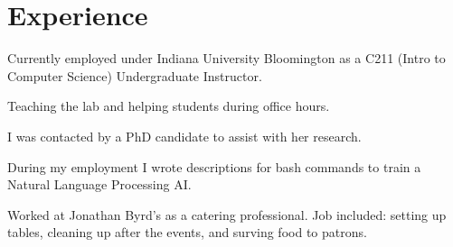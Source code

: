 \documentclass[]{deedy-resume-openfont}
\begin{document}
%
%
\lastupdated

%
%



\section{Experience}

\vspace{\topsep} %
\begin{tightemize}
\item Currently employed under Indiana University Bloomington as a C211 (Intro to Computer Science) Undergraduate Instructor.
\item Teaching the lab and helping students during office hours.
\end{tightemize}
\sectionsep

\vspace{\topsep} %
\begin{tightemize}
\item I was contacted by a PhD candidate to assist with her research.
\item During my employment I wrote descriptions for bash commands to train a Natural Language Processing AI.
\end{tightemize}
\sectionsep

\begin{tightemize}
\item Worked at Jonathan Byrd’s as a catering professional. Job included: setting up tables,
cleaning up after the events, and surving food to patrons.
\end{tightemize}
\sectionsep
\end{document}

